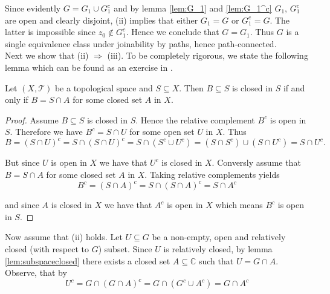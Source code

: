 \begin{enumerate}[label = \textbf{Exercise \arabic*.},wide = 0pt, itemsep=1.5ex]
Since evidently $G = G_1 \cup G_1^c$ and by lemma \ref{lem:G_1} and \ref{lem:G_1^c} $G_1$, $G_1^c$ are open and clearly disjoint, (ii) implies that either $G_1 = G$ or $G_1^c = G$. The latter is impossible since $z_0 \notin G_1^c$. Hence we conclude that $G = G_1$. Thus $G$ is a single equivalence class under joinability by paths, hence path-connected.\\
	Next we show that (ii) $\Rightarrow$ (iii). To be completely rigorous, we state the following lemma which can be found as an exercise in \cite[50]{lee:topological_manifolds:2011}.
	\begin{lemma}
		Let $(X,\mathcal{T})$ be a topological space and $S \subseteq X$. Then $B \subseteq S$ is closed in $S$ if and only if $B = S \cap A$ for some closed set $A$ in $X$.
		\label{lem:subspaceclosed}
	\end{lemma}

	\begin{proof}
		Assume $B \subseteq S$ is closed in $S$. Hence the relative complement $B^c$ is open in $S$. Therefore we have $B^c = S \cap U$ for some open set $U$ in $X$. Thus
		\begin{equation*}
			B = (S \cap U)^c = S \cap (S \cap U)^c = S \cap (S^c \cup U^c) = (S \cap S^c) \cup (S \cap U^c) = S \cap U^c.
		\end{equation*}

		But since $U$ is open in $X$ we have that $U^c$ is closed in $X$. Conversly assume that $B = S \cap A$ for some closed set $A$ in $X$. Taking relative complements yields
		\begin{equation*}
			B^c = (S \cap A)^c = S \cap (S \cap A)^c = S \cap A^c
		\end{equation*}

		\noindent and since $A$ is closed in $X$ we have that $A^c$ is open in $X$ which means $B^c$ is open in $S$.
	\end{proof}

	Now assume that (ii) holds. Let $U \subseteq G$ be a non-empty, open and relatively closed (with respect to $G$) subset. Since $U$ is relatively closed, by lemma \ref{lem:subspaceclosed} there exists a closed set $A \subseteq \mathbb{C}$ such that $U = G \cap A$. Observe, that by
	\begin{equation*}
		U^c = G \cap (G \cap A)^c = G \cap (G^c \cup A^c) = G \cap A^c
	\end{equation*}


\end{enumerate}
